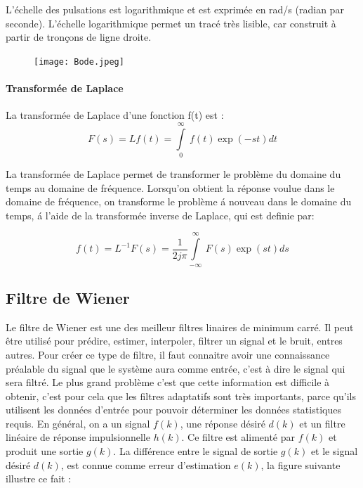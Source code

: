 \documentclass[conference,onecolumn]{IEEEtran}
\begin{document}
L'échelle des pulsations est logarithmique et est exprimée en rad/s (radian par seconde). L'échelle logarithmique permet un tracé très lisible, car construit à partir de tronçons de ligne droite.

\begin{figure}[H]
 \centering
    \texttt{[image: Bode.jpeg]}
\end{figure}

\paragraph{Transformée de Laplace}
La transformée de Laplace d’une fonction f(t) est :
\begin{equation}
    F(s) = L{f(t)} = \int\limits_{0}^{\infty}\ f(t)\exp(-st) dt
\end{equation}

La transformée de Laplace permet de transformer le problème du domaine du temps au domaine de fréquence.
Lorsqu’on obtient la réponse voulue dans le domaine de fréquence, on transforme le problème á nouveau dans le domaine du temps, á l’aide de la transformée inverse de Laplace, qui est definie par:

\begin{equation}
    f(t) = L^{-1}{F(s)} = \frac{1}{2j\pi} \int\limits_{-\infty}^{\infty} \ F(s)\exp(st) ds
\end{equation}

\subsection{\textbf{Filtre de Wiener}}
Le filtre de Wiener est une des meilleur filtres linaires de minimum carré. Il peut être utilisé pour prédire, estimer, interpoler, filtrer un signal et le bruit, entres autres. Pour créer ce type de filtre, il faut connaitre avoir une connaissance préalable du signal que le système aura comme entrée, c’est à dire le signal qui sera filtré. Le plus grand problème c’est que cette information est difficile à obtenir, c’est pour cela que les filtres adaptatifs sont très importants, parce qu’ils utilisent les données d’entrée pour pouvoir déterminer les données statistiques requis. En général, on a un signal $f(k)$, une réponse désiré $d(k)$ et un filtre linéaire de réponse impulsionnelle $h(k)$. Ce filtre est alimenté par $f(k)$ et produit une sortie $g(k)$. La différence entre le signal de sortie $g(k)$ et le signal désiré $d(k)$, est connue comme erreur d’estimation $e(k)$, la figure suivante illustre ce fait :
\end{document}

